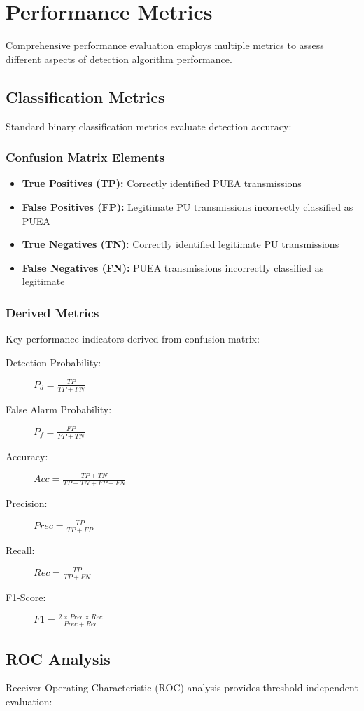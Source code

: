 \section{Performance Metrics}
Comprehensive performance evaluation employs multiple metrics to assess different aspects of detection algorithm performance.

\subsection{Classification Metrics}
Standard binary classification metrics evaluate detection accuracy:

\subsubsection{Confusion Matrix Elements}
\begin{itemize}
\item \textbf{True Positives (TP):} Correctly identified PUEA transmissions
\item \textbf{False Positives (FP):} Legitimate PU transmissions incorrectly classified as PUEA
\item \textbf{True Negatives (TN):} Correctly identified legitimate PU transmissions  
\item \textbf{False Negatives (FN):} PUEA transmissions incorrectly classified as legitimate
\end{itemize}

\subsubsection{Derived Metrics}
Key performance indicators derived from confusion matrix:

\begin{description}
\item[Detection Probability:] $P_d = \frac{TP}{TP + FN}$
\item[False Alarm Probability:] $P_f = \frac{FP}{FP + TN}$
\item[Accuracy:] $Acc = \frac{TP + TN}{TP + TN + FP + FN}$
\item[Precision:] $Prec = \frac{TP}{TP + FP}$
\item[Recall:] $Rec = \frac{TP}{TP + FN}$
\item[F1-Score:] $F1 = \frac{2 \times Prec \times Rec}{Prec + Rec}$
\end{description}

\subsection{ROC Analysis}
Receiver Operating Characteristic (ROC) analysis provides threshold-independent evaluation:

